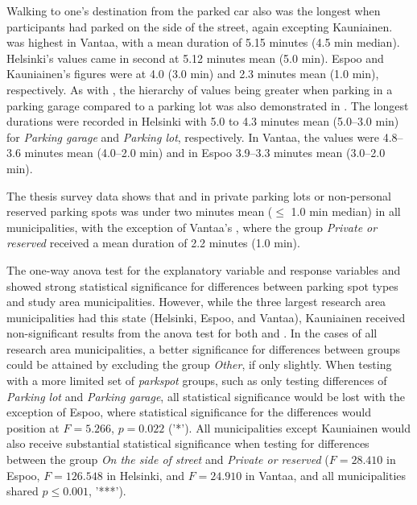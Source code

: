 Walking to one's destination from the parked car also was the longest when participants had parked on the side of the street, again excepting Kauniainen.  was highest in Vantaa, with a mean duration of 5.15 minutes (4.5 min median). Helsinki's values came in second at 5.12 minutes mean (5.0 min). Espoo and Kauniainen's figures were at 4.0 (3.0 min) and 2.3 minutes mean (1.0 min), respectively. As with , the hierarchy of values being greater when parking in a parking garage compared to a parking lot was also demonstrated in . The longest durations were recorded in Helsinki with 5.0 to 4.3 minutes mean (5.0--3.0 min) for \textit{Parking garage} and \textit{Parking lot}, respectively. In Vantaa, the values were 4.8--3.6 minutes mean (4.0--2.0 min) and in Espoo 3.9--3.3 minutes mean (3.0--2.0 min). 

The thesis survey data shows that  and  in private parking lots or non-personal reserved parking spots was under two minutes mean ($\leq$ 1.0 min median) in all municipalities, with the exception of Vantaa's , where the group \textit{Private or reserved} received a mean duration of 2.2 minutes (1.0 min).

The one-way \acrshort{anova} test for the explanatory variable  and response variables  and  showed strong statistical significance for differences between parking spot types and study area municipalities. However, while the three largest research area municipalities had this state (Helsinki, Espoo, and Vantaa), Kauniainen received non-significant results from the \acrshort{anova} test for both  and . In the cases of all research area municipalities, a better significance for differences between  groups could be attained by excluding the group \textit{Other}, if only slightly. When testing with a more limited set of \textit{parkspot} groups, such as only testing differences of \textit{Parking lot} and \textit{Parking garage}, all statistical significance would be lost with the exception of Espoo, where statistical significance for the differences would position at $F = 5.266$, $p = 0.022$ ('*'). All municipalities except Kauniainen would also receive substantial statistical significance when testing for differences between the group \textit{On the side of street} and \textit{Private or reserved} ($F = 28.410$ in Espoo, $F = 126.548$ in Helsinki, and $F = 24.910$ in Vantaa, and all municipalities shared $p \leq 0.001$, '***').

